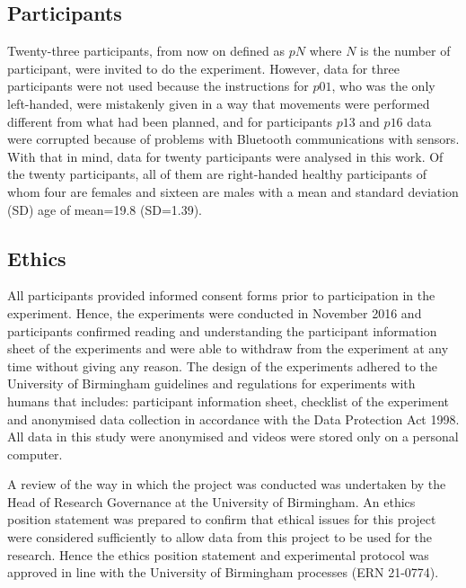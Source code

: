 \documentclass[fleqn,10pt]{wlscirep}
\begin{document}
\subsection*{Participants}
Twenty-three participants, from now on defined as $pN$ where $N$ is the number of participant, were invited to do the experiment. However, data for three participants were not used because the instructions for $p01$, who was the only left-handed, were mistakenly given in a way that movements were performed different from what had been planned, and for participants $p13$ and $p16$ data were corrupted because of problems with Bluetooth communications with sensors.
With that in mind, data for twenty participants were analysed in this work.
Of the twenty participants, all of them are right-handed healthy participants of whom four are females and sixteen are males with a mean and standard deviation (SD) age of mean=19.8 (SD=1.39).

\subsection*{Ethics}
All participants provided informed consent forms prior to participation in the experiment. 
Hence, the experiments were conducted in November 2016 and participants confirmed reading and understanding the participant information sheet of the experiments and were able to withdraw from the experiment at any time without giving any reason.
The design of the experiments adhered to the University of Birmingham guidelines and regulations for experiments with humans that includes: participant information sheet, checklist of the experiment and anonymised data collection in accordance with the Data Protection Act 1998.
All data in this study were anonymised and videos were stored only on a personal computer.

A review of the way in which the project was conducted was undertaken by the Head of Research Governance at the University of Birmingham. 
An ethics position statement was prepared to confirm that ethical issues for this project were considered sufficiently to allow data from this project to be used for the research.    
Hence the ethics position statement and experimental protocol was approved in line with the University of Birmingham processes (ERN 21-0774).
\end{document}
